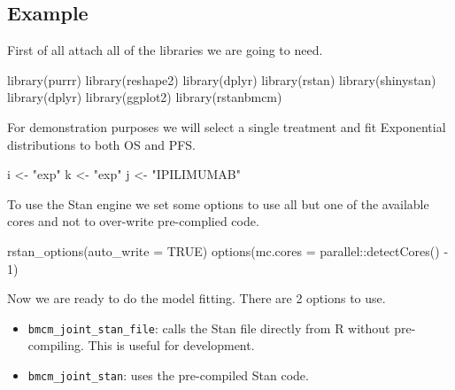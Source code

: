 \documentclass[
]{article}
\newenvironment{Shaded}{\begin{snugshade}}{\end{snugshade}}
\newcommand{\AttributeTok}[1]{\textcolor[rgb]{0.77,0.63,0.00}{#1}}
\newcommand{\ConstantTok}[1]{\textcolor[rgb]{0.00,0.00,0.00}{#1}}
\newcommand{\DecValTok}[1]{\textcolor[rgb]{0.00,0.00,0.81}{#1}}
\newcommand{\FunctionTok}[1]{\textcolor[rgb]{0.00,0.00,0.00}{#1}}
\newcommand{\NormalTok}[1]{#1}
\newcommand{\OtherTok}[1]{\textcolor[rgb]{0.56,0.35,0.01}{#1}}
\newcommand{\SpecialCharTok}[1]{\textcolor[rgb]{0.00,0.00,0.00}{#1}}
\newcommand{\StringTok}[1]{\textcolor[rgb]{0.31,0.60,0.02}{#1}}
\providecommand{\tightlist}{%
  \setlength{\itemsep}{0pt}\setlength{\parskip}{0pt}}
\begin{document}
\hypertarget{example}{%
\subsection{Example}\label{example}}

First of all attach all of the libraries we are going to need.

\begin{Shaded}
\begin{Highlighting}[]
\FunctionTok{library}\NormalTok{(purrr)}
\FunctionTok{library}\NormalTok{(reshape2)}
\FunctionTok{library}\NormalTok{(dplyr)}
\FunctionTok{library}\NormalTok{(rstan)}
\FunctionTok{library}\NormalTok{(shinystan)}
\FunctionTok{library}\NormalTok{(dplyr)}
\FunctionTok{library}\NormalTok{(ggplot2)}
\FunctionTok{library}\NormalTok{(rstanbmcm)}
\end{Highlighting}
\end{Shaded}

For demonstration purposes we will select a single treatment and fit
Exponential distributions to both OS and PFS.

\begin{Shaded}
\begin{Highlighting}[]
\NormalTok{i }\OtherTok{\textless{}{-}}  \StringTok{"exp"}
\NormalTok{k }\OtherTok{\textless{}{-}} \StringTok{"exp"}
\NormalTok{j }\OtherTok{\textless{}{-}} \StringTok{"IPILIMUMAB"}
\end{Highlighting}
\end{Shaded}

To use the Stan engine we set some options to use all but one of the
available cores and not to over-write pre-complied code.

\begin{Shaded}
\begin{Highlighting}[]
\FunctionTok{rstan\_options}\NormalTok{(}\AttributeTok{auto\_write =} \ConstantTok{TRUE}\NormalTok{)}
\FunctionTok{options}\NormalTok{(}\AttributeTok{mc.cores =}\NormalTok{ parallel}\SpecialCharTok{::}\FunctionTok{detectCores}\NormalTok{() }\SpecialCharTok{{-}} \DecValTok{1}\NormalTok{)}
\end{Highlighting}
\end{Shaded}

Now we are ready to do the model fitting. There are 2 options to use.

\begin{itemize}
\tightlist
\item
  \texttt{bmcm\_joint\_stan\_file}: calls the Stan file directly from R
  without pre-compiling. This is useful for development.
\item
  \texttt{bmcm\_joint\_stan}: uses the pre-compiled Stan code.
\end{itemize}
\end{document}
